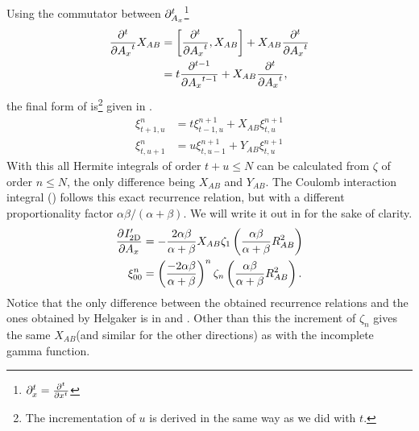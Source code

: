     Using the commutator between
    $\mathrm{\partial}^t_{A_x}$\footnote{$\prtl^t_x=\prd{x}[][t]$}
        \begin{align}
            \prd{A_x}[][t] X_{AB} &= \left[\prd{A_x}[][t], X_{AB}\right] +
            X_{AB}\prd{A_x}[][t] \nonumber \\
            &= t\prd{A_x}[][t-1] + X_{AB}\prd{A_x}[][t],
        \end{align}
    the final form of  is\footnote{The incrementation of $u$ is
    derived in the same way as we did with $t$.} given in
    .
        \begin{equation}
            \begin{aligned}
                \xi^n_{t+1,u} &= t\xi^{n+1}_{t-1,u} + X_{AB}\xi^{n+1}_{t,u} \\
                \xi^n_{t,u+1} &= u\xi^{n+1}_{t,u-1} + Y_{AB}\xi^{n+1}_{t,u}
            \end{aligned}
            \label{eq:incfinalfinal}
        \end{equation}
    With this all Hermite integrals of order $t+u\leq N$ can be calculated from
    $\zeta$ of order $n\leq N$, the only difference being $X_{AB}$ and
    $Y_{AB}$. The Coulomb interaction integral
    () follows this exact recurrence
    relation, but with a different proportionality factor
    $\alpha\beta/(\alpha+\beta)$. We will write it out in
     for the sake of clarity.
        \begin{equation}
            \begin{aligned}
                \prd{A_x}[I'_{\text{2D}}] &= -\frac{2\alpha\beta}{\alpha+\beta}
                X_{AB}\zeta_1\left(\frac{\alpha\beta}{\alpha+\beta}R^2_{AB}\right)
                \\
                \xi^n_{00} &= \left(\frac{-2\alpha\beta}{\alpha+\beta}\right)^n
                \zeta_n\left(\frac{\alpha\beta}{\alpha+\beta} R^2_{AB}\right).
            \end{aligned}
            \label{eq:recurrInteraction}
        \end{equation}
    Notice that the only difference between the obtained recurrence relations
    and the ones obtained by Helgaker\cite{HelgakerGauss} is in
     and . Other than this the
    increment of $\zeta_n$ gives the same $X_{AB}$(and similar for the other
    directions) as with the incomplete gamma function.

